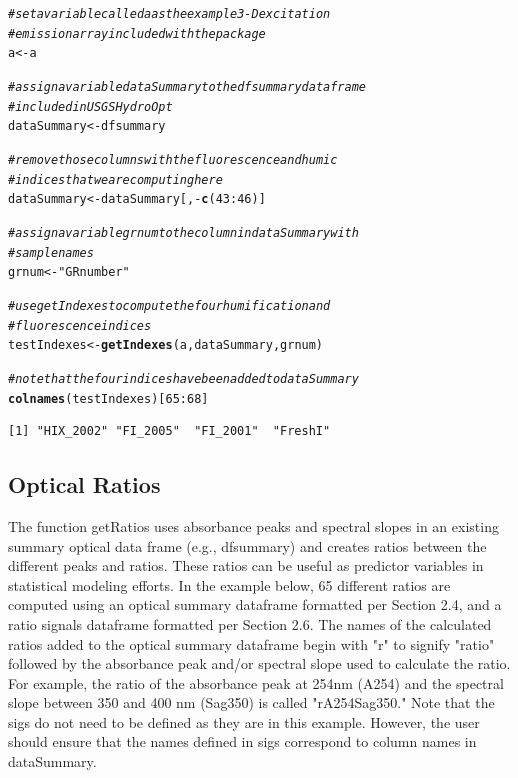 \documentclass[a4paper,11pt]{article}\usepackage[]{graphicx}\usepackage[]{color}
\makeatletter
\newcommand{\hlnum}[1]{\textcolor[rgb]{0.686,0.059,0.569}{#1}}%
\newcommand{\hlstr}[1]{\textcolor[rgb]{0.192,0.494,0.8}{#1}}%
\newcommand{\hlcom}[1]{\textcolor[rgb]{0.678,0.584,0.686}{\textit{#1}}}%
\newcommand{\hlopt}[1]{\textcolor[rgb]{0,0,0}{#1}}%
\newcommand{\hlstd}[1]{\textcolor[rgb]{0.345,0.345,0.345}{#1}}%
\newcommand{\hlkwb}[1]{\textcolor[rgb]{0.69,0.353,0.396}{#1}}%
\newcommand{\hlkwd}[1]{\textcolor[rgb]{0.737,0.353,0.396}{\textbf{#1}}}%
\newenvironment{kframe}{%
 \def\at@end@of@kframe{}%
 \ifinner\ifhmode%
  \def\at@end@of@kframe{\end{minipage}}%
  \begin{minipage}{\columnwidth}%
 \fi\fi%
 \def\FrameCommand##1{\hskip\@totalleftmargin \hskip-\fboxsep
 \colorbox{shadecolor}{##1}\hskip-\fboxsep
     \hskip-\linewidth \hskip-\@totalleftmargin \hskip\columnwidth}%
 \MakeFramed {\advance\hsize-\width
   \@totalleftmargin\z@ \linewidth\hsize
   \@setminipage}}%
 {\par\unskip\endMakeFramed%
 \at@end@of@kframe}
\newenvironment{knitrout}{}{} %
\makeatother
\begin{document}
\begin{knitrout}
\color{fgcolor}\begin{kframe}
\begin{alltt}
\hlcom{# set a variable called a as the example 3-D excitation}
\hlcom{# emission array included with the package}
\hlstd{a} \hlkwb{<-} \hlstd{a}

\hlcom{# assign a variable dataSummary to the dfsummary dataframe}
\hlcom{# included in USGSHydroOpt}
\hlstd{dataSummary} \hlkwb{<-} \hlstd{dfsummary}

\hlcom{# remove those columns with the fluorescence and humic}
\hlcom{# indices that we are computing here}
\hlstd{dataSummary} \hlkwb{<-} \hlstd{dataSummary[,} \hlopt{-}\hlkwd{c}\hlstd{(}\hlnum{43}\hlopt{:}\hlnum{46}\hlstd{)]}

\hlcom{# assign a variable grnum to the column in dataSummary with}
\hlcom{# sample names}
\hlstd{grnum} \hlkwb{<-} \hlstr{"GRnumber"}

\hlcom{# use getIndexes to compute the four humification and}
\hlcom{# fluorescence indices}
\hlstd{testIndexes} \hlkwb{<-} \hlkwd{getIndexes}\hlstd{(a, dataSummary, grnum)}

\hlcom{# note that the four indices have been added to dataSummary}
\hlkwd{colnames}\hlstd{(testIndexes)[}\hlnum{65}\hlopt{:}\hlnum{68}\hlstd{]}
\end{alltt}
\begin{verbatim}
[1] "HIX_2002" "FI_2005"  "FI_2001"  "FreshI"  
\end{verbatim}
\end{kframe}
\end{knitrout}

\subsection{Optical Ratios}
The function getRatios uses absorbance peaks and spectral slopes in an existing summary optical data frame (e.g., dfsummary) and creates ratios between the different peaks and ratios. These ratios can be useful as predictor variables in statistical modeling efforts. In the example below, 65 different ratios are computed using an optical summary dataframe formatted per Section 2.4, and a ratio signals dataframe formatted per Section 2.6. The names of the calculated ratios added to the optical summary dataframe begin with "r" to signify "ratio" followed by the absorbance peak and/or spectral slope used to calculate the ratio. For example, the ratio of the absorbance peak at 254nm (A254) and the spectral slope between 350 and 400 nm (Sag350) is called "rA254\textunderscore Sag350." Note that the sigs do not need to be defined as they are in this example. However, the user should ensure that the names defined in sigs correspond to column names in dataSummary.
\end{document}
